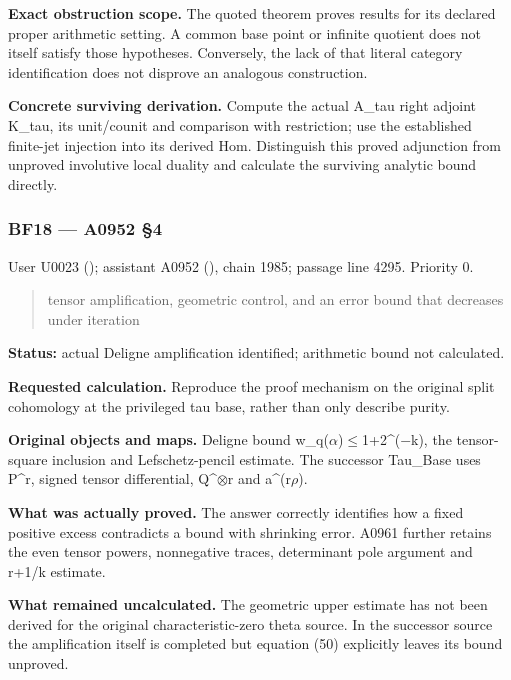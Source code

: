 \textbf{Exact obstruction scope.} The quoted theorem proves results for
its declared proper arithmetic setting. A common base point or infinite
quotient does not itself satisfy those hypotheses. Conversely, the lack
of that literal category identification does not disprove an analogous
construction.

\textbf{Concrete surviving derivation.} Compute the actual A\_tau right
adjoint K\_tau, its unit/counit and comparison with restriction; use the
established finite-jet injection into its derived Hom. Distinguish this
proved adjunction from unproved involutive local duality and calculate
the surviving analytic bound directly.

\subsubsection{BF18 --- A0952 §4}\label{TranscriptLedgerStage:bf18-a0952-4}

User U0023 (\protect{});
assistant A0952 (\protect{}),
chain 1985; passage line 4295. Priority 0.

\begin{quote}
tensor amplification, geometric control, and an error bound that
decreases under iteration
\end{quote}

\textbf{Status:} actual Deligne amplification identified; arithmetic
bound not calculated.

\textbf{Requested calculation.} Reproduce the proof mechanism on the
original split cohomology at the privileged tau base, rather than only
describe purity.

\textbf{Original objects and maps.} Deligne bound
w\_q(\allowbreak{}\ensuremath{α}\allowbreak{})\allowbreak{}\ensuremath{≤}\allowbreak{}1+2\textasciicircum{}(\allowbreak{}\ensuremath{−}\allowbreak{}k),
the tensor-square inclusion and Lefschetz-pencil estimate. The successor
Tau\_Base uses P\^{}r, signed tensor differential,
Q\textasciicircum{}\allowbreak{}\ensuremath{⊗}\allowbreak{}r and
a\textasciicircum{}(r\allowbreak{}\ensuremath{ρ}\allowbreak{}).

\textbf{What was actually proved.} The answer correctly identifies how a
fixed positive excess contradicts a bound with shrinking error. A0961
further retains the even tensor powers, nonnegative traces, determinant
pole argument and r+1/k estimate.

\textbf{What remained uncalculated.} The geometric upper estimate has
not been derived for the original characteristic-zero theta source. In
the successor source the amplification itself is completed but equation
(50) explicitly leaves its bound unproved.

